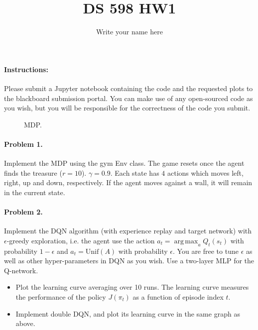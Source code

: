 \documentclass{article}
\title{DS 598 HW1}
\author{Write your name here}
\DeclareMathOperator*{\argmax}{arg\,max}
\newcommand*{\xMin}{0}%
\newcommand*{\xMax}{4}%
\newcommand*{\yMin}{0}%
\newcommand*{\yMax}{4}%
\begin{document}
\maketitle

\paragraph{Instructions:} Please submit a Jupyter notebook containing the code and the requested plots to the blackboard submission portal. You can make use of any open-sourced code as you wish, but you will be responsible for the correctness of the code you submit.

\begin{figure}[!h]
\centering
{}
\caption{MDP.}
\end{figure}

\paragraph{Problem 1.} Implement the MDP using the gym Env class. The game resets once the agent finds the treasure ($r=10$). $\gamma = 0.9$. Each state has $4$ actions which moves left, right, up and down, respectively. If the agent moves against a wall, it will remain in the current state.


\paragraph{Problem 2.} Implement the DQN algorithm (with experience replay and target network) with $\epsilon$-greedy exploration, i.e. the agent use the action $a_t = \argmax_a Q_t(s_t)$ with probability $1-\epsilon$ and $a_t = \text{Unif}(A)$ with probability $\epsilon$. You are free to tune $\epsilon$ as well as other hyper-parameters in DQN as you wish. Use a two-layer MLP for the Q-network. 
\begin{itemize}
    \item Plot the learning curve averaging over 10 runs. The learning curve measures the performance of the policy $J(\pi_t)$ as a function of episode index $t$.
    \item Implement double DQN, and plot its learning curve in the same graph as above.
\end{itemize}
\end{document}
